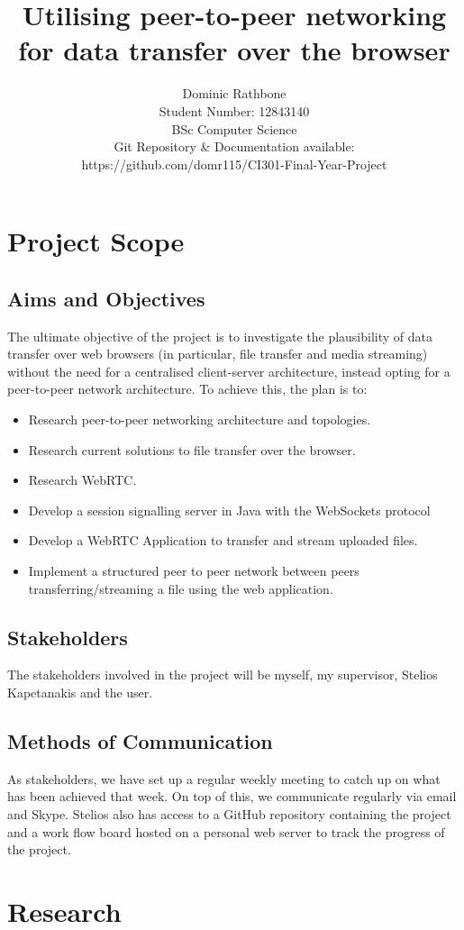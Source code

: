 \documentclass[]{report}
\title{Utilising peer-to-peer networking for data transfer over the browser}
\author{
	 Dominic Rathbone
	 \\ Student Number: 12843140 
	 \\ BSc Computer Science 
	 \\ Git Repository \& Documentation available: 
	 \\	https://github.com/domr115/CI301-Final-Year-Project 
	 }
\begin{document}
\maketitle
\tableofcontents

\chapter{Project Scope}
\section{Aims and Objectives}
	The ultimate objective of the project is to investigate the plausibility of data transfer over web browsers (in particular, file transfer and media streaming) without the need for a centralised client-server architecture, instead opting for a peer-to-peer network architecture. To achieve this, the plan is to:
	\begin{itemize}
		\item Research peer-to-peer networking architecture and topologies.
		\item Research current solutions to file transfer over the browser.
		\item Research WebRTC.
		\item Develop a session signalling server in Java with the WebSockets protocol
		\item Develop a WebRTC Application to transfer and stream uploaded files.
		\item Implement a structured peer to peer network between peers transferring/streaming a file using the web application.
	\end{itemize}
\section{Stakeholders}
	The stakeholders involved in the project will be myself, my supervisor, Stelios Kapetanakis and the user.
\section{Methods of Communication}
	As stakeholders, we have set up a regular weekly meeting to catch up on what has been achieved that week. On top of this, we communicate regularly via email and Skype. Stelios also has access to a GitHub repository containing the project and a work flow board hosted on a personal web server to track the progress of the project. 
	
\chapter{Research}
	
\end{document}
